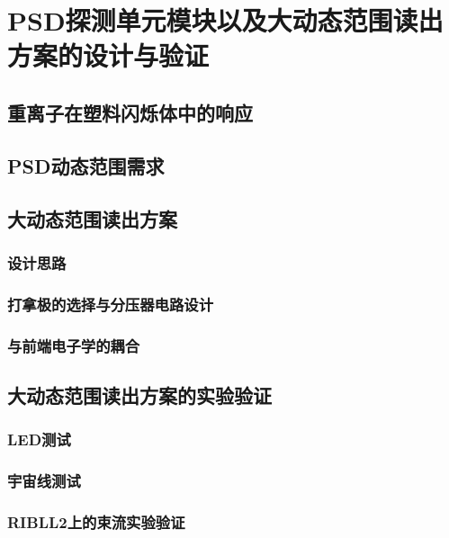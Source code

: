\chapter{PSD探测单元模块以及大动态范围读出方案的设计与验证}

\section{重离子在塑料闪烁体中的响应}

\section{PSD动态范围需求}

\section{大动态范围读出方案}
\subsection{设计思路}
\subsection{打拿极的选择与分压器电路设计}
\subsection{与前端电子学的耦合}

\section{大动态范围读出方案的实验验证}
\subsection{LED测试}
\subsection{宇宙线测试}
\subsection{RIBLL2上的束流实验验证}
